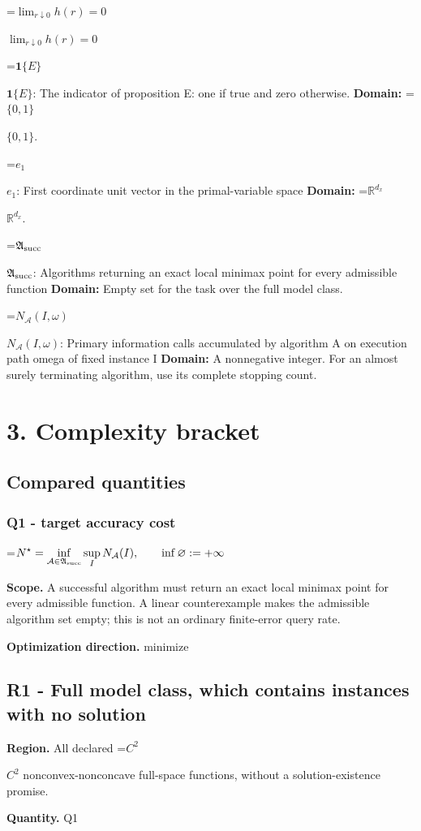 \documentclass[10pt,a4paper]{article}
\newcommand{\AtlasMath}[1]{\par\begingroup\centering\setbox0=\hbox{$\displaystyle #1$}\ifdim\wd0>1.4\linewidth\typeout{ATLAS WIDE FORMULA: \the\wd0}\fi\ifdim\wd0>\linewidth\resizebox{\linewidth}{!}{\box0}\else\box0\fi\par\endgroup}
\newcommand{\AtlasInlineMath}[1]{\begingroup\setbox0=\hbox{$#1$}\ifdim\wd0>.4\linewidth\endgroup\AtlasMath{#1}\else\endgroup$#1$\fi}
\begin{document}
\AtlasInlineMath{\lim_{r\downarrow0}h(r)=0}

\AtlasInlineMath{\mathbf1\{E\}}: The indicator of proposition E: one if true and zero otherwise. \textbf{Domain:} \AtlasInlineMath{\{0,1\}}.

\AtlasInlineMath{e_1}: First coordinate unit vector in the primal-variable space \textbf{Domain:} \AtlasInlineMath{\mathbb R^{d_x}}.

\AtlasInlineMath{\mathfrak A_{\rm succ}}: Algorithms returning an exact local minimax point for every admissible function \textbf{Domain:} Empty set for the task over the full model class.

\AtlasInlineMath{N_{\mathcal A}(I,\omega)}: Primary information calls accumulated by algorithm A on execution path omega of fixed instance I \textbf{Domain:} A nonnegative integer. For an almost surely terminating algorithm, use its complete stopping count.

\section{3. Complexity bracket}
\subsection{Compared quantities}
\subsubsection{Q1 - target accuracy cost}
\AtlasMath{N^\star=\inf_{\mathcal A\in\mathfrak A_{\rm succ}}\sup_I N_{\mathcal A}(I),\qquad\inf\varnothing:=+\infty}
\textbf{Scope.} A successful algorithm must return an exact local minimax point for every admissible function. A linear counterexample makes the admissible algorithm set empty; this is not an ordinary finite-error query rate.

\textbf{Optimization direction.} minimize

\subsection{R1 - Full model class, which contains instances with no solution}
\textbf{Region.} All declared \AtlasInlineMath{C^2} nonconvex-nonconcave full-space functions, without a solution-existence promise.

\textbf{Quantity.} Q1
\end{document}
